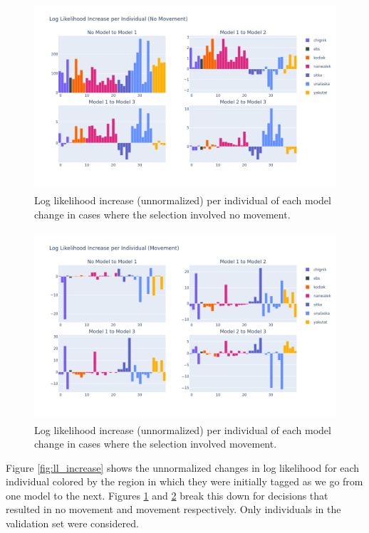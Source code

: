 \documentclass[11pt]{article}
\begin{document}
\begin{figure}[h!] 
	\centering
  \includegraphics[height=70mm]{figures/ll_increase_no_movement.png}
  \caption{Log likelihood increase (unnormalized) per individual of each model change in cases where the selection involved no movement.}
  \label{fig:ll_increase_no_movement}
\end{figure}

\FloatBarrier

\begin{figure}[h!] 
	\centering
  \includegraphics[height=70mm]{figures/ll_increase_movement.png}
  \caption{Log likelihood increase (unnormalized) per individual of each model change in cases where the selection involved movement.}
  \label{fig:ll_increase_movement}
\end{figure}



Figure \ref{fig:ll_increase} shows the unnormalized changes in log likelihood for each individual colored by the region in which they were initially tagged as we go from one model to the next. Figures \ref{fig:ll_increase_no_movement} and \ref{fig:ll_increase_movement} break this down for decisions that resulted in no movement and movement respectively. Only individuals in the validation set were considered.
\end{document}
